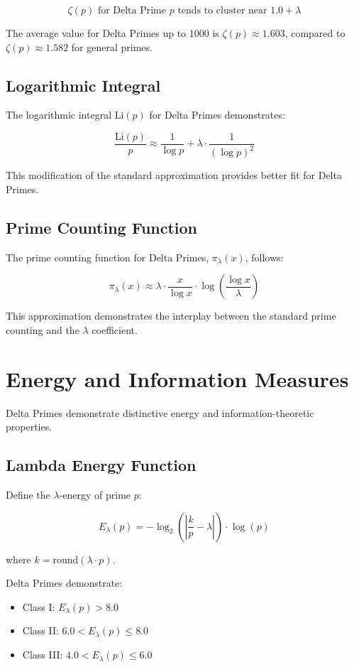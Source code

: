 \documentclass[12pt,a4paper]{report}
\newcommand{\lambdaval}{\lambda}
\begin{document}
\begin{itemize}
\[
\zeta(p) \text{ for Delta Prime } p \text{ tends to cluster near } 1.0 + \lambdaval
\]

The average value for Delta Primes up to 1000 is $\zeta(p) \approx 1.603$, compared to $\zeta(p) \approx 1.582$ for general primes.

\subsection{Logarithmic Integral}

The logarithmic integral $\text{Li}(p)$ for Delta Primes demonstrates:

\[
\frac{\text{Li}(p)}{p} \approx \frac{1}{\log p} + \lambdaval \cdot \frac{1}{(\log p)^2}
\]

This modification of the standard approximation provides better fit for Delta Primes.

\subsection{Prime Counting Function}

The prime counting function for Delta Primes, $\pi_{\lambdaval}(x)$, follows:

\[
\pi_{\lambdaval}(x) \approx \lambdaval \cdot \frac{x}{\log x} \cdot \log\left(\frac{\log x}{\lambdaval}\right)
\]

This approximation demonstrates the interplay between the standard prime counting and the $\lambdaval$ coefficient.

\section{Energy and Information Measures}

Delta Primes demonstrate distinctive energy and information-theoretic properties.

\subsection{Lambda Energy Function}

Define the $\lambdaval$-energy of prime $p$:

\[
E_{\lambdaval}(p) = -\log_2\left(\left| \frac{k}{p} - \lambdaval \right|\right) \cdot \log(p)
\]

where $k = \text{round}(\lambdaval \cdot p)$.

Delta Primes demonstrate:
\begin{itemize}
\item Class I: $E_{\lambdaval}(p) > 8.0$
\item Class II: $6.0 < E_{\lambdaval}(p) \leq 8.0$
\item Class III: $4.0 < E_{\lambdaval}(p) \leq 6.0$
\end{itemize}


\end{itemize}
\end{document}
